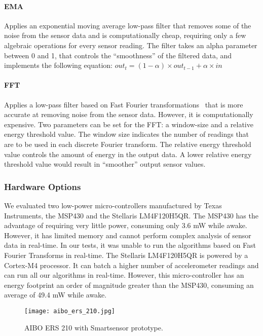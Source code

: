   \paragraph{EMA} Applies an exponential moving average low-pass
  filter that removes some of the noise from the sensor data and is
  computationally cheap, requiring only a few algebraic operations for
  every sensor reading. The filter takes an alpha parameter between 0
  and 1, that controls the ``smoothness'' of the filtered data, and
  implements the following equation: $out_{t} = (1-\alpha) \times
  out_{t-1} + \alpha \times in$

  \paragraph{FFT} Applies a low-pass filter based on Fast Fourier
  transformations~\cite{libbyFootstepDetection} that is more accurate
  at removing noise from the sensor data. However, it is
  computationally expensive. Two parameters can be set for the
  FFT: a window-size and a relative energy threshold value. The
  window size indicates the number of readings that are to be used in
  each discrete Fourier transform. The relative energy threshold value
  controls the amount of energy in the output data. A lower relative
  energy threshold value would result in ``smoother'' output sensor
  values.
\fi

\subsubsection{Hardware Options}

We evaluated two low-power micro-controllers manufactured by Texas
Instruments, the MSP430 and the Stellaris LM4F120H5QR.  The MSP430 has
the advantage of requiring very little power, consuming only 3.6 mW
while awake.  However, it has limited memory and cannot perform complex
analysis of sensor data in real-time.  In our tests, it was unable to
run the algorithms based on Fast Fourier Transforms in real-time.  
The Stellaris LM4F120H5QR is powered by a Cortex-M4 processor.  It can 
batch a higher number of accelerometer
readings and can run all our algorithms in real-time.  However, this
micro-controller has an energy footprint an order of magnitude greater
than the MSP430, consuming an average of 49.4 mW while awake.

\begin{figure}[t]
	\texttt{[image: aibo\_ers\_210.jpg]}
	\caption{AIBO ERS 210 with Smartsensor prototype.}
	\label{fig:aibo}
\end{figure}

